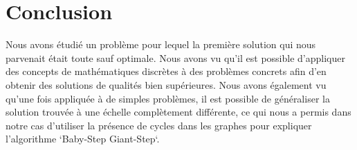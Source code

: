 \section{Conclusion}

Nous avons étudié un problème pour lequel la première solution qui nous parvenait était toute sauf optimale. Nous avons vu qu'il est possible d'appliquer des concepts de mathématiques discrètes à des problèmes concrets afin d'en obtenir des solutions de qualités bien supérieures.
Nous avons également vu qu'une fois appliquée à de simples problèmes, il est possible de généraliser la solution trouvée à une échelle complètement différente, ce qui nous a permis dans notre cas d'utiliser la présence de cycles dans les graphes pour expliquer l'algorithme `Baby-Step Giant-Step`.

